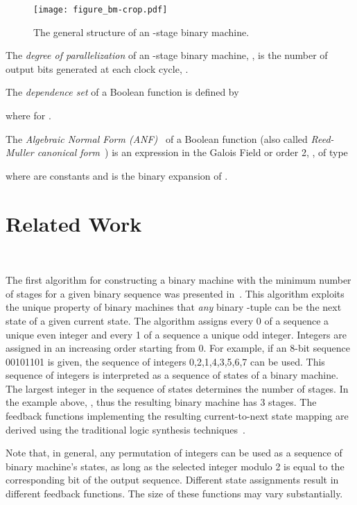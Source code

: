 \documentclass[10pt,conference]{IEEEtran}
\begin{document}
\begin{figure}[t!]
\begin{center}
    \texttt{[image: figure\_bm-crop.pdf]}
\caption{The general structure of an -stage binary machine.}\label{bin_machine}
\end{center}
\end{figure}

The {\em degree of parallelization} of an -stage binary machine, , is the number of output bits  generated at each clock cycle, .






The {\em dependence set} of a Boolean function  is defined by

where 
for .



The {\em Algebraic Normal Form (ANF)}~\cite{CuS09} of a Boolean function  
(also called {\em Reed-Muller canonical form}~\cite{Gr91})
is an expression in the Galois Field or order 2, , of type

where  are constants
and  is the binary
expansion of .


\section{Related Work}~\label{prev}

The first algorithm for constructing a binary machine with the minimum number of stages for a
given binary sequence was presented in~\cite{Du10aj}. This algorithm 
exploits the unique property of binary machines that {\em  any} binary -tuple can be the next state of 
a given current state. 
The algorithm assigns every 0 of a sequence a unique even integer and every 1 of a sequence a unique odd integer.
Integers are assigned in an increasing order starting from 0. For example, if an 8-bit sequence
00101101 is given, the sequence of integers 0,2,1,4,3,5,6,7 can be used. This sequence of integers is interpreted as
a sequence of states of a binary machine. The largest integer in the sequence of states
determines the number of stages. In the example above, ,
thus the resulting binary machine has 3 stages. 
The feedback
functions  implementing the resulting current-to-next state mapping
are derived using the traditional logic synthesis 
techniques~\cite{espr}. 

Note that, in general, any permutation of integers 
can be used as a sequence of binary machine's states, as long as the selected integer modulo 2 is equal to the corresponding bit of the output sequence.
Different state assignments result in different feedback functions. The size of these 
functions may vary substantially. 
\end{document}
